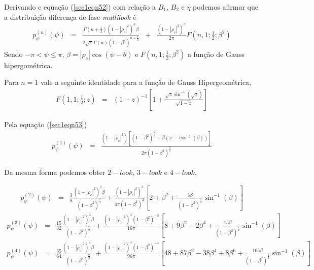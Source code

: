\documentclass[10pt,a4paper]{article}
\begin{document}
Derivando e equação (\ref{sec1eqn52}) com relação a $B_1$, $B_2$ e $\eta$ podemos afirmar que a distribuição diferença de fase {\it multilook} é 
\begin{equation}\label{sec1eqn53}
\begin{array}{ccccc}
	p_{\psi}^{(n)}(\psi)&=&\frac{\Gamma(n+\frac{1}{2})(1-|\rho_c|^2)^n\beta}{2\sqrt{\pi}\Gamma(n)(1-\beta^2)^{n+\frac{1}{2}}}&+&\frac{(1-|\rho_c|^2)^n}{2\pi}F(n,1;\frac{1}{2};\beta^2)
\end{array}
\end{equation}
Sendo $-\pi<\psi\leq\pi$, $\beta=|\rho_c|\cos(\psi-\theta)$ e $F(n,1;\frac{1}{2};\beta^2)$ a função de Gauss hipergométrica.

Para $n=1$  vale a seguinte identidade para a função de Gauss Hipergeométrica,
\begin{equation}\label{sec1eqn54}
\begin{array}{ccc}
	F(1,1;\frac{1}{2};z)&=&(1-z)^{-1}\left[1+\frac{\sqrt{z}\sin^{-1}(\sqrt{z})}{\sqrt{1-z}}\right]
\end{array}
\end{equation}

Pela equação (\ref{sec1eqn53})
\begin{equation}\label{sec1eqn55}
\begin{array}{ccc}
	p_{\psi}^{(1)}(\psi)&=&\frac{(1-|\rho_c|^2)[(1-\beta^{2})^{\frac{1}{2}}+\beta(\pi-\cos^{-1}(\beta))]}{2\pi(1-\beta^{2})^{\frac{3}{2}}}
\end{array}
\end{equation}

Da mesma forma podemos obter $2-look$, $3-look$ e $4-look$,

\begin{equation}\label{sec1eqn56}
\begin{array}{ccc}
	p_{\psi}^{(2)}(\psi)&=&\frac{3}{8}\frac{(1-|\rho_c|^2)^2\beta}{(1-\beta^2)^{\frac{5}{2}}}+\frac{(1-|\rho_c|^2)^2}{4\pi(1-\beta^2)^{2}}\left[2+\beta^2+\frac{3\beta}{(1-\beta^2)^{\frac{1}{2}}}\sin^{-1}(\beta)\right]
\end{array}
\end{equation}
\begin{equation}\label{sec1eqn57}
\begin{array}{ccc}
	p_{\psi}^{(3)}(\psi)&=&\frac{15}{32}\frac{(1-|\rho_c|^2)^3\beta}{(1-\beta^2)^{\frac{7}{2}}}+\frac{(1-|\rho_c|^2)^3(1-\beta^2)^{-3}}{16\pi}\left[8+9\beta^2-2\beta^4+\frac{15\beta}{(1-\beta^2)^{\frac{1}{2}}}\sin^{-1}(\beta)\right]
\end{array}
\end{equation}
\begin{equation}\label{sec1eqn58}
\begin{array}{ccc}
	p_{\psi}^{(4)}(\psi)&=&\frac{35}{64}\frac{(1-|\rho_c|^2)^4\beta}{(1-\beta^2)^{\frac{9}{2}}}+\frac{(1-|\rho_c|^2)^4(1-\beta^2)^{-4}}{96\pi}\left[48+87\beta^2-38\beta^4+8\beta^6+\frac{105\beta}{(1-\beta^2)^{\frac{1}{2}}}\sin^{-1}(\beta)\right]
\end{array}
\end{equation}
\end{document}
